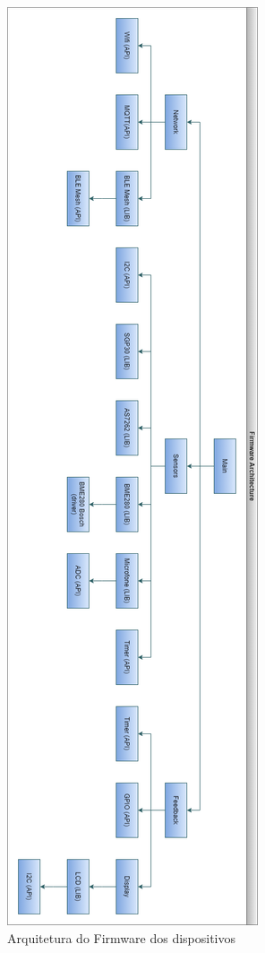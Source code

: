 \documentclass[../monografia.tex]{subfiles}
\begin{document}
\begin{figure}[h!]
	\centering
	\includegraphics[height=0.9\textheight]{fw-arch}
	\caption{Arquitetura do Firmware dos dispositivos}
	\label{fig:fw-arch}
\end{figure}
\end{document}
